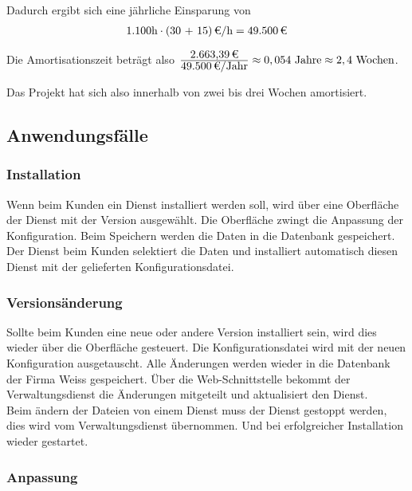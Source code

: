 Dadurch ergibt sich eine jährliche Einsparung von 
\begin{eqnarray}
1.100 \mbox{h} \cdot \eur{(30 + 15)}{\mbox{/h}} = \eur{49.500}
\end{eqnarray}

Die Amortisationszeit beträgt also $\frac{\eur{2.663,39}}{\eur{49.500}\mbox{/Jahr}} \approx 0,054 \mbox{ Jahre} \approx 2,4 \mbox{ Wochen}$.

Das Projekt hat sich also innerhalb von zwei bis drei Wochen amortisiert. 

\subsection{Anwendungsfälle}
\label{sec:Anwendungsfaelle}

\subsubsection{Installation}
\label{sec:Fall_Installation}

Wenn beim Kunden ein Dienst installiert werden soll, wird über eine Oberfläche der Dienst mit der Version ausgewählt. Die Oberfläche zwingt die Anpassung der Konfiguration. Beim Speichern werden die Daten in die Datenbank gespeichert. Der Dienst beim Kunden selektiert die Daten und installiert automatisch diesen Dienst mit der gelieferten Konfigurationsdatei.

\subsubsection{Versionsänderung}
\label{sec:Fall_Update}

Sollte beim Kunden eine neue oder andere Version installiert sein, wird dies wieder über die Oberfläche gesteuert. Die Konfigurationsdatei wird mit der neuen Konfiguration ausgetauscht. Alle Änderungen werden wieder in die Datenbank der Firma Weiss gespeichert. Über die Web-Schnittstelle bekommt der Verwaltungsdienst die Änderungen mitgeteilt und aktualisiert den Dienst. \\
Beim ändern der Dateien von einem Dienst muss der Dienst gestoppt werden, dies wird vom Verwaltungsdienst übernommen. Und bei erfolgreicher Installation wieder gestartet. 

\subsubsection{Anpassung}
\label{sec:Fall_Anpassung}

